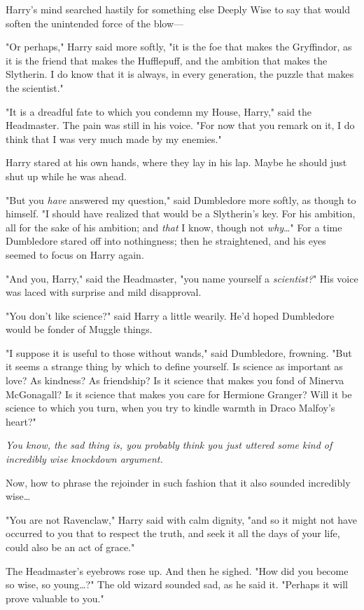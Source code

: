 Harry’s mind searched hastily for something else Deeply Wise to say that would
soften the unintended force of the blow—

"Or perhaps," Harry said more softly, "it is the foe that makes the Gryffindor,
as it is the friend that makes the Hufflepuff, and the ambition that makes the
Slytherin. I do know that it is always, in every generation, the puzzle that
makes the scientist."

"It is a dreadful fate to which you condemn my House, Harry," said the
Headmaster. The pain was still in his voice. "For now that you remark on it, I
do think that I was very much made by my enemies."

Harry stared at his own hands, where they lay in his lap. Maybe he should just
shut up while he was ahead.

"But you \emph{have} answered my question," said Dumbledore more softly, as
though to himself. "I should have realized that would be a Slytherin’s key. For
his ambition, all for the sake of his ambition; and \emph{that} I know, though
not \emph{why}…" For a time Dumbledore stared off into nothingness; then
he straightened, and his eyes seemed to focus on Harry again.

"And you, Harry," said the Headmaster, "you name yourself a \emph{scientist?}"
His voice was laced with surprise and mild disapproval.

"You don’t like science?" said Harry a little wearily. He’d hoped Dumbledore
would be fonder of Muggle things.

"I suppose it is useful to those without wands," said Dumbledore, frowning.
"But it seems a strange thing by which to define yourself. Is science as
important as love? As kindness? As friendship? Is it science that makes you
fond of Minerva McGonagall? Is it science that makes you care for Hermione
Granger? Will it be science to which you turn, when you try to kindle warmth in
Draco Malfoy’s heart?"

\emph{You know, the sad thing is, you probably think you just uttered some kind
of incredibly wise knockdown argument.}

Now, how to phrase the rejoinder in such fashion that it also sounded
incredibly wise…

"You are not Ravenclaw," Harry said with calm dignity, "and so it might not
have occurred to you that to respect the truth, and seek it all the days of
your life, could also be an act of grace."

The Headmaster’s eyebrows rose up. And then he sighed. "How did you become so
wise, so young…?" The old wizard sounded sad, as he said it. "Perhaps it
will prove valuable to you."

